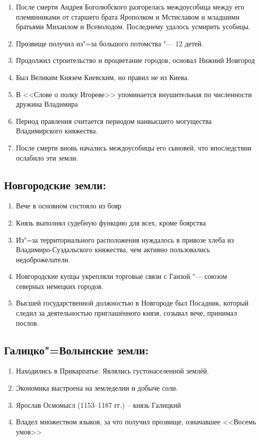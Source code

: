\begin{enumerate}
{        \begin{enumerate}
            \item{ После смерти Андрея Боголюбского разгорелась междоусобица между его племянниками от старшего брата Ярополком и Мстиславом и младшими братьями Михаилом и Всеволодом. Последнему удалось усмирить усобицы.}
            \item{ Прозвище получил из"=за большого потомства "--- 12 детей.}
            \item{ Продолжил строительство и процветание городов, основал Нижний Новгород}
            \item{ Был Великим Князем Киевским, но правил не из Киева.}
            \item{ В <<Слове о полку Игореве>> упоминается внушительная по численности дружина Владимира}
            \item{ Период правления считается периодом наивысшего могущества Владимирского княжества.}
            \item{ После смерти вновь начались междоусобицы его сыновей, что впоследствии ослабило эти земли.}
        \end{enumerate}
    }
\end{enumerate}

\subsection{Новгородские земли:}

\begin{enumerate}
    \item{ Вече в основном состояло из бояр}
    \item{ Князь выполнял судебную функцию для всех, кроме боярства}
    \item{ Из"=за территориального расположения нуждалось в привозе хлеба из Владимиро-Суздальского княжества, чем активно пользовались недоброжелатели. }
    \item{ Новгородские купцы укрепляли торговые связи с Ганзой "--- союзом северных немецких городов.}
    \item{ Высшей государственной должностью в Новгороде  был Посадник, который следил за деятельностью приглашённого князя, созывал вече, принимал послов.}
\end{enumerate}

\subsection{Галицко"=Волынские земли:}

\begin{enumerate}
    \item{ Находились в Прикарпатье. Являлись густонаселенной землёй.}
    \item{ Экономика выстроена на земледелии и добыче соли.}
    \item{ Ярослав Осмомысл (1153--1187 гг.) – князь Галицкий}
    \item{ Владел множеством языков, за что получил прозвище, означавшее <<Восемь умов>>}
\end{enumerate}
